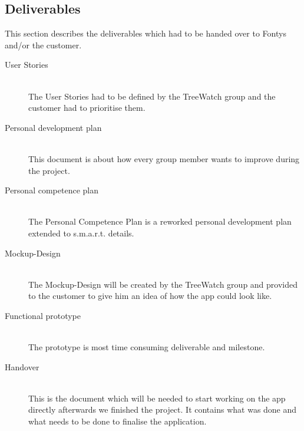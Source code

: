 \subsection{Deliverables}
This section describes the deliverables which had to be handed over to Fontys and/or the customer.
\begin{description}
	\item[User Stories] \hfill \\
	The User Stories had to be defined by the TreeWatch group and the customer had to prioritise them.
	\item[Personal development plan] \hfill \\
	This document is about how every group member wants to improve during the project.
	\item[Personal competence plan] \hfill \\
	The Personal Competence Plan is a reworked personal development plan extended to s.m.a.r.t. details.
	\item[Mockup-Design] \hfill \\
	The Mockup-Design will be created by the TreeWatch group and provided to the customer to give him an idea of how the \gls{app} could look like.
	\item[Functional prototype] \hfill \\
	The prototype is most time consuming deliverable and milestone. 
	\item[Handover] \hfill \\
	This is the document which will be needed to start working on the \gls{app} directly afterwards we finished the project. It contains what was done and what needs to be done to finalise the application.
\end{description}